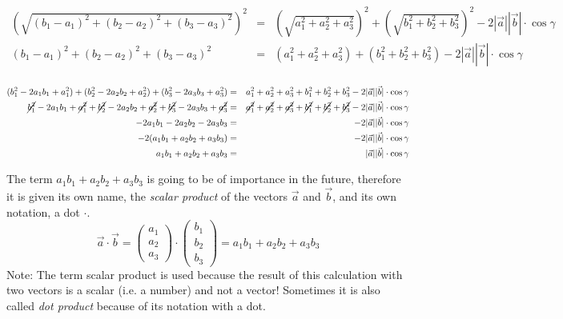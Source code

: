 \documentclass[12pt,eng]{skript_ogg}
\begin{document}
\hspace{-15mm}\parbox[t]{20cm}{\begin{eqnarray*}
\left(\sqrt{(b_1-a_1)^2+(b_2-a_2)^2+(b_3-a_3)^2}\right)^2 & = &
\left(\sqrt{a_1^2+a_2^2+a_3^2}\right)^2+\left(\sqrt{b_1^2+b_2^2+b_3^2}\right)^2-2|\vec{a}||\vec{b}|\cdot\cos\gamma\\
(b_1-a_1)^2+(b_2-a_2)^2+(b_3-a_3)^2 & = &
(a_1^2+a_2^2+a_3^2)+(b_1^2+b_2^2+b_3^2)-2|\vec{a}||\vec{b}|\cdot\cos\gamma\\
\end{eqnarray*}

\vspace{-15mm}

\begin{eqnarray*}
(b_1^2-2a_1b_1+a_1^2)+(b_2^2-2a_2b_2+a_2^2)+(b_3^2-2a_3b_3+a_3^2) & = & a_1^2+a_2^2+a_3^2+b_1^2+b_2^2+b_3^2-2|\vec{a}||\vec{b}|\cdot\cos\gamma\\
\cancel{b_1^2}-2a_1b_1+\cancel{a_1^2}+\cancel{b_2^2}-2a_2b_2+\cancel{a_2^2}+\cancel{b_3^2}-2a_3b_3+\cancel{a_3^2} & = & \cancel{a_1^2}+\cancel{a_2^2}+\cancel{a_3^2}+\cancel{b_1^2}+\cancel{b_2^2}+\cancel{b_3^2}-2|\vec{a}||\vec{b}|\cdot\cos\gamma\\
-2a_1b_1-2a_2b_2-2a_3b_3 & = & -2|\vec{a}||\vec{b}|\cdot\cos\gamma\\
-2(a_1b_1+a_2b_2+a_3b_3) & = & -2|\vec{a}||\vec{b}|\cdot\cos\gamma\\
a_1b_1+a_2b_2+a_3b_3 & = & |\vec{a}||\vec{b}|\cdot\cos\gamma\\
\end{eqnarray*}}

\begin{defn}
The term $a_1b_1+a_2b_2+a_3b_3$ is going to be of importance in the future, therefore it is given its own name, the \emph{scalar product} of the vectors $\vec{a}$ and $\vec{b}$, and its own notation, a dot $\cdot$.
\[\vec{a}\cdot\vec{b}=\begin{pmatrix}a_1\\a_2\\a_3
\end{pmatrix}\cdot\begin{pmatrix}b_1\\b_2\\b_3
\end{pmatrix}=a_1b_1+a_2b_2+a_3b_3\]
Note: The term scalar product is used because the result of this calculation with two vectors is a scalar (i.e. a number) and not a vector! Sometimes it is also called \emph{dot product} because of its notation with a dot.
\end{defn}
\end{document}
